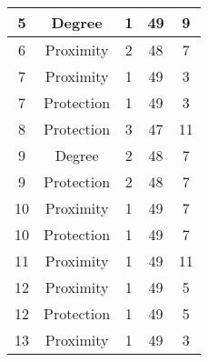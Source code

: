 \documentclass[results.tex]{subfiles}
\begin{document}
\begin{center}
\begin{tabular}{| c || c | c | c | c |}
            \hline
            5                       & Degree                       & 1                      & 49                      & 9                    \\
            \hline
            6                       & Proximity                    & 2                      & 48                      & 7                    \\
            \hline
            7                       & Proximity                    & 1                      & 49                      & 3                    \\
            \hline
            7                       & Protection                   & 1                      & 49                      & 3                    \\
            \hline
            8                       & Protection                   & 3                      & 47                      & 11                   \\
            \hline
            9                       & Degree                       & 2                      & 48                      & 7                    \\
            \hline
            9                       & Protection                   & 2                      & 48                      & 7                    \\
            \hline
            10                      & Proximity                    & 1                      & 49                      & 7                    \\
            \hline
            10                      & Protection                   & 1                      & 49                      & 7                    \\
            \hline
            11                      & Proximity                    & 1                      & 49                      & 11                   \\
            \hline
            12                      & Proximity                    & 1                      & 49                      & 5                    \\
            \hline
            12                      & Protection                   & 1                      & 49                      & 5                    \\
            \hline
            13                      & Proximity                    & 1                      & 49                      & 3                    \\

\end{tabular}
\end{center}
\end{document}

